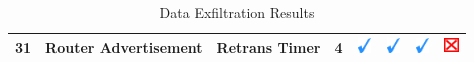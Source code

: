 \documentclass[12pt]{article}
\begin{document}
\begin{savenotes}
\begin{table}[!h]
{{\begin{tabular}{|C{1.0cm}|L{5.0cm}|L{5.0cm}|C{2.0cm}|C{1.0cm}|C{1.0cm}|C{1.0cm}|C{1.0cm}|}
31&Router Advertisement&Retrans Timer&4&\includegraphics[width=4mm, height=4mm]{ok}&\includegraphics[width=4mm, height=4mm]{ok}&\includegraphics[width=4mm, height=4mm]{ok}&\includegraphics[width=4mm, height=4mm]{notok}\\
\hline
\end{tabular}}}
\caption{Data Exfiltration Results}
\label{table:exfiltrationResults1}
\end{table}
\end{savenotes}
\end{document}
